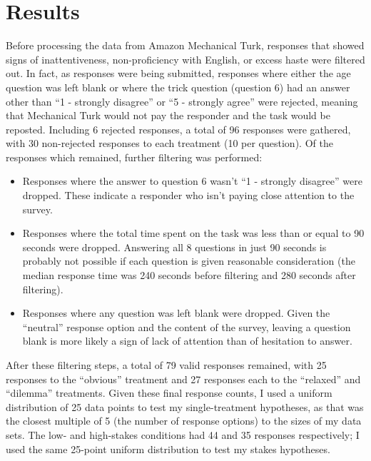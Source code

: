 \section{Results}

Before processing the data from Amazon Mechanical Turk, responses that showed signs of inattentiveness, non-proficiency with English, or excess haste were filtered out.
%
In fact, as responses were being submitted, responses where either the age question was left blank or where the trick question (question 6) had an answer other than ``1 - strongly disagree'' or ``5 - strongly agree'' were rejected, meaning that Mechanical Turk would not pay the responder and the task would be reposted.
%
Including 6 rejected responses, a total of 96 responses were gathered, with 30 non-rejected responses to each treatment (10 per question).
%
Of the responses which remained, further filtering was performed:
%
\begin{itemize}
  \item Responses where the answer to question 6 wasn't ``1 - strongly disagree'' were dropped. These indicate a responder who isn't paying close attention to the survey.
  \item Responses where the total time spent on the task was less than or equal to 90 seconds were dropped. Answering all 8 questions in just 90 seconds is probably not possible if each question is given reasonable consideration (the median response time was 240 seconds before filtering and 280 seconds after filtering).
  \item Responses where any question was left blank were dropped. Given the ``neutral'' response option and the content of the survey, leaving a question blank is more likely a sign of lack of attention than of hesitation to answer.
\end{itemize}
%
After these filtering steps, a total of 79 valid responses remained, with 25 responses to the ``obvious'' treatment and 27 responses each to the ``relaxed'' and ``dilemma'' treatments.
%
Given these final response counts, I used a uniform distribution of 25 data points to test my single-treatment hypotheses, as that was the closest multiple of 5 (the number of response options) to the sizes of my data sets.
%
The low- and high-stakes conditions had 44 and 35 responses respectively; I used the same 25-point uniform distribution to test my stakes hypotheses.


